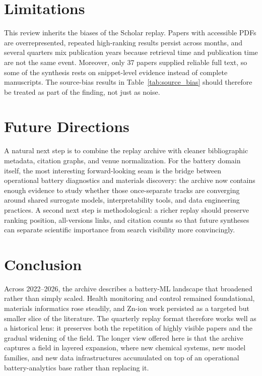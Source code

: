 \documentclass[journal]{IEEEtran}
\begin{document}
\section{Limitations}
This review inherits the biases of the Scholar replay. Papers with accessible PDFs are overrepresented, repeated high-ranking results persist across months, and several quarters mix publication years because retrieval time and publication time are not the same event. Moreover, only 37 papers supplied reliable full text, so some of the synthesis rests on snippet-level evidence instead of complete manuscripts. The source-bias results in Table~\ref{tab:source_bias} should therefore be treated as part of the finding, not just as noise.

\section{Future Directions}
A natural next step is to combine the replay archive with cleaner bibliographic metadata, citation graphs, and venue normalization. For the battery domain itself, the most interesting forward-looking seam is the bridge between operational battery diagnostics and materials discovery: the archive now contains enough evidence to study whether those once-separate tracks are converging around shared surrogate models, interpretability tools, and data engineering practices. A second next step is methodological: a richer replay should preserve ranking position, all-versions links, and citation counts so that future syntheses can separate scientific importance from search visibility more convincingly.

\section{Conclusion}
Across 2022--2026, the archive describes a battery-ML landscape that broadened rather than simply scaled. Health monitoring and control remained foundational, materials informatics rose steadily, and Zn-ion work persisted as a targeted but smaller slice of the literature. The quarterly replay format therefore works well as a historical lens: it preserves both the repetition of highly visible papers and the gradual widening of the field. The longer view offered here is that the archive captures a field in layered expansion, where new chemical systems, new model families, and new data infrastructures accumulated on top of an operational battery-analytics base rather than replacing it.



\end{document}

